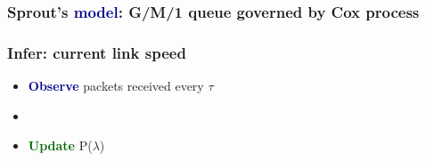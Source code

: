 \documentclass[svgnames]{beamer}
\begin{document}
\begin{frame}

\begin{centering}
\frametitle{Sprout's \textcolor{DarkBlue}{\bf model}: G/M/1 queue governed by Cox process}
\def\svgwidth{\columnwidth}

\end{centering}



\end{frame}

\begin{frame}
\frametitle{\textbf{Infer}: current link speed}

\Large

\begin{itemize}

\item \textcolor{DarkBlue}{\bf Observe} packets received every $\tau$

\item[]

\item \textcolor{DarkGreen}{\bf Update} P($\lambda$)

\end{itemize}

\end{frame}
\end{document}
